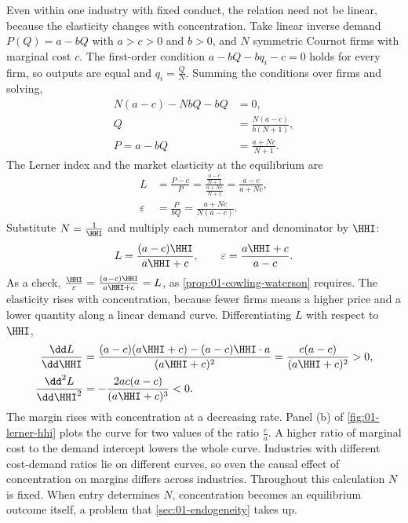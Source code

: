 Even within one industry with fixed conduct, the relation need not be linear, because the elasticity changes
with concentration. Take linear inverse demand $P(Q) = a - bQ$ with $a > c > 0$ and $b > 0$, and $N$ symmetric
Cournot firms with marginal cost $c$. The first-order condition $a - bQ - bq_i - c = 0$ holds for every firm, so
outputs are equal and $q_i = \frac{Q}{N}$. Summing the conditions over firms and solving,
\begin{align*}
  N(a - c) - NbQ - bQ &= 0, \\
  Q &= \frac{N(a - c)}{b(N + 1)}, \\
  P = a - bQ &= \frac{a + Nc}{N + 1} .
\end{align*}
The Lerner index and the market elasticity at the equilibrium are
\begin{align*}
  L &= \frac{P - c}{P} = \frac{\frac{a - c}{N + 1}}{\frac{a + Nc}{N + 1}} = \frac{a - c}{a + Nc}, \\
  \varepsilon &= \frac{P}{bQ} = \frac{a + Nc}{N(a - c)} .
\end{align*}
Substitute $N = \frac{1}{\HHI}$ and multiply each numerator and denominator by $\HHI$:
\begin{equation}\label{eq:01-linear-cournot-LH}
  L = \frac{(a - c)\HHI}{a\HHI + c}, \qquad \varepsilon = \frac{a\HHI + c}{a - c} .
\end{equation}
As a check, $\frac{\HHI}{\varepsilon} = \frac{(a - c)\HHI}{a\HHI + c} = L$, as \cref{prop:01-cowling-waterson}
requires. The elasticity rises with concentration, because fewer firms means a higher price and a lower quantity
along a linear demand curve. Differentiating $L$ with respect to $\HHI$,
\begin{align*}
  \frac{\dd L}{\dd \HHI} &= \frac{(a - c)(a\HHI + c) - (a - c)\HHI \cdot a}{(a\HHI + c)^2}
  = \frac{c(a - c)}{(a\HHI + c)^2} > 0, \\
  \frac{\dd^2 L}{\dd \HHI^2} &= -\frac{2ac(a - c)}{(a\HHI + c)^3} < 0 .
\end{align*}
The margin rises with concentration at a decreasing rate. Panel (b) of \cref{fig:01-lerner-hhi} plots the curve
for two values of the ratio $\frac{c}{a}$. A higher ratio of marginal cost to the demand intercept lowers the
whole curve. Industries with different cost-demand ratios lie on different curves, so even the causal effect of
concentration on margins differs across industries. Throughout this calculation $N$ is fixed. When entry
determines $N$, concentration becomes an equilibrium outcome itself, a problem that \cref{sec:01-endogeneity}
takes up.

